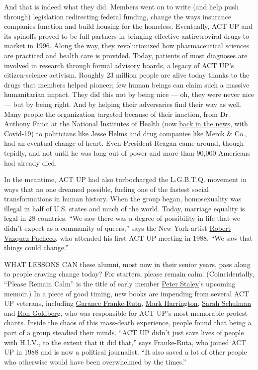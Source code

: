 And that is indeed what they did. Members went on to write (and help
push through) legislation redirecting federal funding, change the ways
insurance companies function and build housing for the homeless.
Eventually, ACT UP and its spinoffs proved to be full partners in
bringing effective antiretroviral drugs to market in 1996. Along the
way, they revolutionized how pharmaceutical sciences are practiced and
health care is provided. Today, patients of most diagnoses are involved
in research through formal advisory boards, a legacy of ACT UP's
citizen-science activism. Roughly 23 million people are alive today
thanks to the drugs that members helped pioneer; few human beings can
claim such a massive humanitarian impact. They did this not by being
nice --- oh, they were never nice --- but by being right. And by helping
their adversaries find their way as well. Many people the organization
targeted because of their inaction, from Dr. Anthony Fauci at the
National Institutes of Health (now
\href{https://www.nytimes3xbfgragh.onion/2020/03/28/technology/coronavirus-fauci-trump-conspiracy-target.html}{back
in the news}, with Covid-19) to politicians like
\href{https://www.nytimes3xbfgragh.onion/topic/person/jesse-helms}{Jesse
Helms} and drug companies like Merck \& Co., had an eventual change of
heart. Even President Reagan came around, though tepidly, and not until
he was long out of power and more than 90,000 Americans had already
died.

In the meantime, ACT UP had also turbocharged the L.G.B.T.Q. movement in
ways that no one dreamed possible, fueling one of the fastest social
transformations in human history. When the group began, homosexuality
was illegal in half of U.S. states and much of the world. Today,
marriage equality is legal in 28 countries. ``We saw there was a degree
of possibility in life that we didn't expect as a community of queers,''
says the New York artist
\href{http://www.actuporalhistory.org/interviews/video/vazquez.html}{Robert
Vazquez-Pacheco}, who attended his first ACT UP meeting in 1988. ``We
saw that things could change.''

WHAT LESSONS CAN these alumni, most now in their senior years, pass
along to people craving change today? For starters, please remain calm.
(Coincidentally, ``Please Remain Calm'' is the title of early member
\href{https://www.nytimes3xbfgragh.onion/2019/03/21/podcasts/the-daily/hiv-aids-cure.html}{Peter
Staley}'s upcoming memoir.) In a piece of good timing, new books are
impending from several ACT UP veterans, including
\href{https://twitter.com/thegarance}{Garance Franke-Ruta},
\href{https://www.treatmentactiongroup.org/about-us/staff/mark-harrington/}{Mark
Harrington},
\href{https://www.nytimes3xbfgragh.onion/2018/04/16/t-magazine/1980s-protest-movements.html}{Sarah
Schulman} and \href{https://c4aa.org/2016/04/ron-goldberg}{Ron
Goldberg}, who was responsible for ACT UP's most memorable protest
chants. Inside the chaos of this mass-death experience, people found
that being a part of a group steadied their minds. ``ACT UP didn't just
save lives of people with H.I.V., to the extent that it did that,'' says
Franke-Ruta, who joined ACT UP in 1988 and is now a political
journalist. ``It also saved a lot of other people who otherwise would
have been overwhelmed by the times.''

